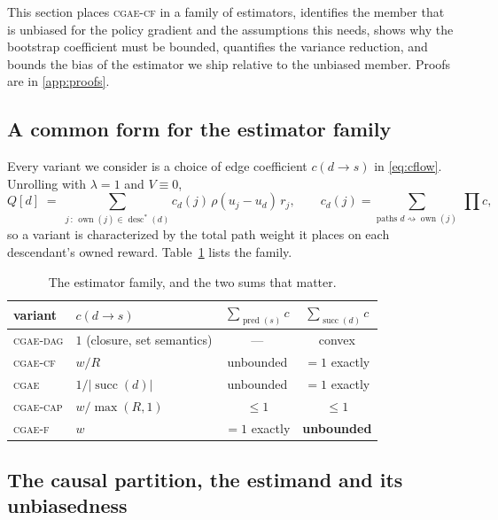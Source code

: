 \documentclass[review,authoryear,3p,times]{elsarticle}
\newcommand{\cgae}{\textsc{cgae}}              %
\newcommand{\cflow}{\textsc{cgae-cf}}          %
\newcommand{\cflowraw}{\textsc{cgae-f}}        %
\newcommand{\cdag}{\textsc{cgae-dag}}          %
\newcommand{\ccap}{\textsc{cgae-cap}}          %
\newcommand{\desc}{\operatorname{desc}}
\newcommand{\pred}{\operatorname{pred}}
\newcommand{\suc}{\operatorname{succ}}
\newcommand{\own}{\operatorname{own}}
\begin{document}
This section places \cflow{} in a family of estimators, identifies the member
that is unbiased for the policy gradient and the assumptions this needs, shows
why the bootstrap coefficient must be bounded, quantifies the variance
reduction, and bounds the bias of the estimator we ship relative to the
unbiased member. Proofs are in \ref{app:proofs}.

\subsection{A common form for the estimator family}

Every variant we consider is a choice of edge coefficient $c(d\!\to\!s)$ in
\eqref{eq:cflow}. Unrolling with $\lambda=1$ and $V\equiv0$,
\begin{equation}
Q[d] \;=\; \sum_{j\,:\,\own(j)\in\desc^{*}(d)} c_d(j)\,\rho(u_j-u_d)\,r_j,
\qquad
c_d(j)=\!\!\sum_{\text{paths } d\rightsquigarrow \own(j)}\ \prod c ,
\label{eq:unroll}
\end{equation}
so a variant is characterized by the total path weight it places on each
descendant's owned reward. Table~\ref{tab:family} lists the family.

\begin{table}[tbp]
\centering
\caption{The estimator family, and the two sums that matter.}
\label{tab:family}
\begin{tabular}{llcc}
\toprule
variant & $c(d\!\to\!s)$ & $\sum_{\pred(s)} c$ & $\sum_{\suc(d)} c$ \\
\midrule
\cdag  & $1$ (closure, set semantics)      & ---            & convex \\
\cflow & $w/R$                             & unbounded      & $=1$ exactly \\
\cgae  & $1/|\suc(d)|$                     & unbounded      & $=1$ exactly \\
\ccap  & $w/\max(R,1)$                     & $\le 1$        & $\le 1$ \\
\cflowraw & $w$                            & $=1$ exactly   & \textbf{unbounded} \\
\bottomrule
\end{tabular}
\end{table}

\subsection{The causal partition, the estimand and its unbiasedness}
\label{sec:estimand}
\end{document}
